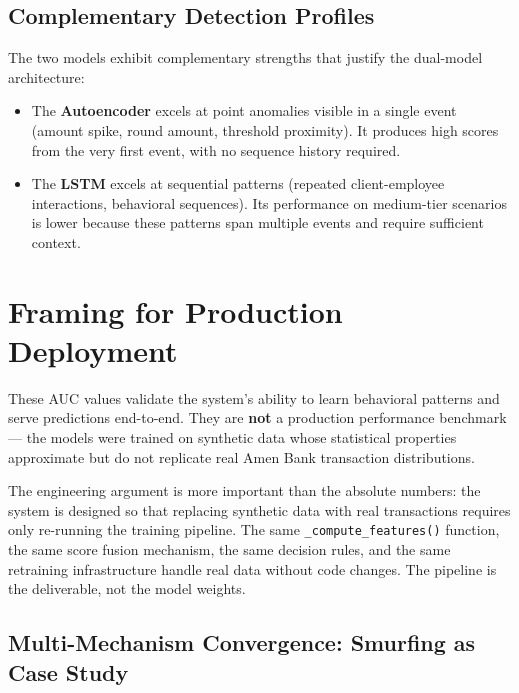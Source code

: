 \subsection{Complementary Detection Profiles}

The two models exhibit complementary strengths that justify the dual-model
architecture:

\begin{itemize}[leftmargin=2cm]
    \item The \textbf{Autoencoder} excels at point anomalies visible in a
          single event (amount spike, round amount, threshold proximity).
          It produces high scores from the very first event, with no
          sequence history required.
    \item The \textbf{LSTM} excels at sequential patterns
          (repeated client-employee interactions, behavioral sequences).
          Its performance on medium-tier scenarios is lower because these
          patterns span multiple events and require sufficient context.
\end{itemize}

\section{Framing for Production Deployment}

These AUC values validate the system's ability to learn behavioral patterns
and serve predictions end-to-end. They are \textbf{not} a production
performance benchmark --- the models were trained on synthetic data whose
statistical properties approximate but do not replicate real Amen Bank
transaction distributions.

The engineering argument is more important than the absolute numbers: the
system is designed so that replacing synthetic data with real transactions
requires only re-running the training pipeline. The same
\texttt{\_compute\_features()} function, the same score fusion mechanism,
the same decision rules, and the same retraining infrastructure handle real
data without code changes. The pipeline is the deliverable, not the model
weights.

\subsection{Multi-Mechanism Convergence: Smurfing as Case Study}

